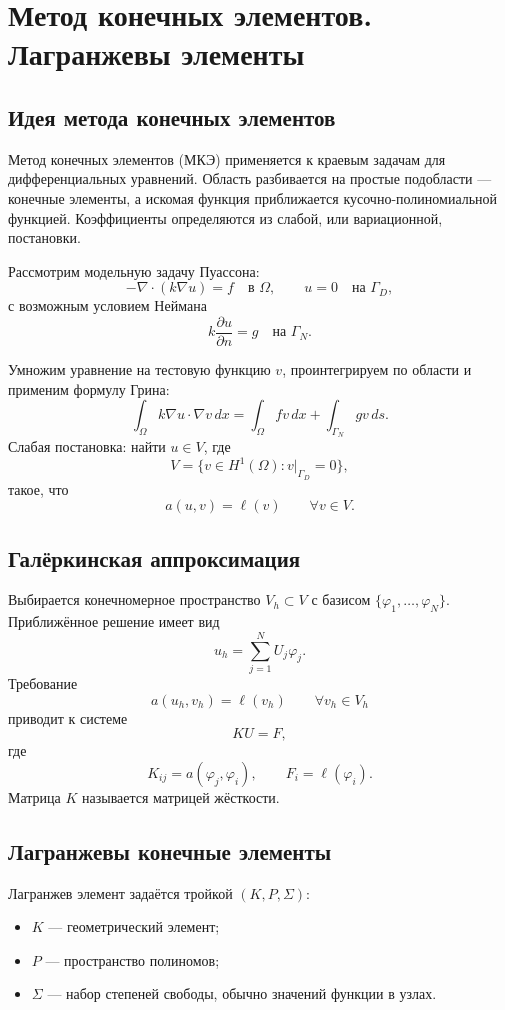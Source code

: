 \section{Метод конечных элементов. Лагранжевы элементы}
\label{sec:fem-lagrange}

\subsection{Идея метода конечных элементов}

Метод конечных элементов (МКЭ) применяется к краевым задачам для
дифференциальных уравнений. Область разбивается на простые подобласти ---
конечные элементы, а искомая функция приближается кусочно-полиномиальной
функцией. Коэффициенты определяются из слабой, или вариационной, постановки.

Рассмотрим модельную задачу Пуассона:
\[
    -\nabla\cdot(k\nabla u)=f\quad\text{в }\Omega,
    \qquad
    u=0\quad\text{на }\Gamma_D,
\]
с возможным условием Неймана
\[
    k\frac{\partial u}{\partial n}=g\quad\text{на }\Gamma_N.
\]

Умножим уравнение на тестовую функцию $v$, проинтегрируем по области и применим
формулу Грина:
\[
    \int_{\Omega} k\nabla u\cdot\nabla v\,dx
    =
    \int_{\Omega}fv\,dx+
    \int_{\Gamma_N}gv\,ds.
\]
Слабая постановка: найти $u\in V$, где
\[
    V=\{v\in H^1(\Omega):v|_{\Gamma_D}=0\},
\]
такое, что
\[
    a(u,v)=\ell(v)
    \qquad\forall v\in V.
\]

\subsection{Галёркинская аппроксимация}

Выбирается конечномерное пространство $V_h\subset V$ с базисом
$\{\varphi_1,\ldots,\varphi_N\}$. Приближённое решение имеет вид
\[
    u_h=\sum_{j=1}^{N}U_j\varphi_j.
\]
Требование
\[
    a(u_h,v_h)=\ell(v_h)
    \qquad\forall v_h\in V_h
\]
приводит к системе
\[
    KU=F,
\]
где
\[
    K_{ij}=a(\varphi_j,\varphi_i),
    \qquad
    F_i=\ell(\varphi_i).
\]
Матрица $K$ называется матрицей жёсткости.

\subsection{Лагранжевы конечные элементы}

Лагранжев элемент задаётся тройкой $(K,P,\Sigma)$:
\begin{itemize}
    \item $K$ --- геометрический элемент;
    \item $P$ --- пространство полиномов;
    \item $\Sigma$ --- набор степеней свободы, обычно значений функции в узлах.
\end{itemize}


